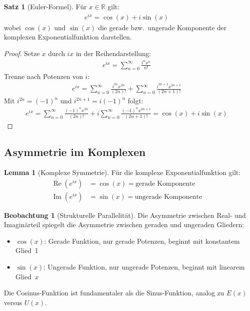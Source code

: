 ﻿\documentclass[a4paper,12pt]{article}
\theoremstyle{definition}
\newtheorem{satz}{Satz}
\newtheorem{lemma}{Lemma}
\newtheorem{beobachtung}{Beobachtung}
\begin{document}
\begin{satz}[Euler-Formel]
Für $x \in \mathbb{R}$ gilt:
\begin{align}
  e^{ix} = \cos(x) + i\sin(x)
\end{align}
wobei $\cos(x)$ und $\sin(x)$ die gerade bzw.\ ungerade Komponente der
komplexen Exponentialfunktion darstellen.
\end{satz}

\begin{proof}
Setze $x$ durch $ix$ in der Reihendarstellung:
\begin{align}
  e^{ix} = \sum_{n=0}^{\infty} \frac{i^n x^n}{n!}
\end{align}
Trenne nach Potenzen von $i$:
\begin{align}
  e^{ix} = \sum_{n=0}^{\infty} \frac{i^{2n} x^{2n}}{(2n)!}
          + \sum_{n=0}^{\infty} \frac{i^{2n+1} x^{2n+1}}{(2n+1)!}
\end{align}
Mit $i^{2n} = (-1)^n$ und $i^{2n+1} = i(-1)^n$ folgt:
\begin{align}
  e^{ix} = \sum_{n=0}^{\infty} \frac{(-1)^n x^{2n}}{(2n)!}
          + i \sum_{n=0}^{\infty} \frac{(-1)^n x^{2n+1}}{(2n+1)!}
         = \cos(x) + i\sin(x)
\end{align}
\end{proof}

\subsection{Asymmetrie im Komplexen}

\begin{lemma}[Komplexe Symmetrie]
Für die komplexe Exponentialfunktion gilt:
\begin{align}
  \operatorname{Re}(e^{ix}) &= \cos(x) = \text{gerade Komponente} \\
  \operatorname{Im}(e^{ix}) &= \sin(x) = \text{ungerade Komponente}
\end{align}
\end{lemma}

\begin{beobachtung}[Strukturelle Parallelität]
Die Asymmetrie zwischen Real- und Imaginärteil spiegelt die Asymmetrie
zwischen geraden und ungeraden Gliedern:
\begin{itemize}
  \item[-] $\cos(x)$: Gerade Funktion, nur gerade Potenzen, beginnt mit
           konstantem Glied~1
  \item[-] $\sin(x)$: Ungerade Funktion, nur ungerade Potenzen, beginnt mit
           linearem Glied~$x$
\end{itemize}
Die Cosinus-Funktion ist fundamentaler als die Sinus-Funktion, analog zu
$E(x)$ versus $U(x)$.
\end{beobachtung}
\end{document}
